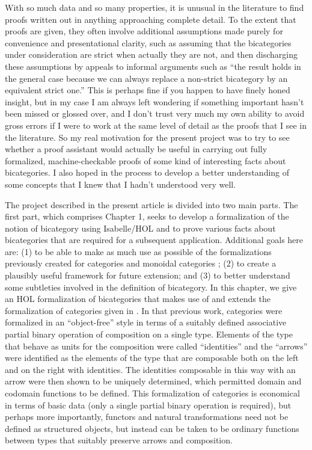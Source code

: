 \documentclass[11pt,notitlepage,a4paper]{report}
\begin{document}
With so much data and so many properties, it is unusual in the literature to find proofs written
out in anything approaching complete detail.
To the extent that proofs are given, they often involve additional assumptions made purely for
convenience and presentational clarity, such as assuming that the bicategories under consideration
are strict when actually they are not, and then discharging these assumptions by appeals to informal
arguments such as ``the result holds in the general case because we can always replace a non-strict
bicategory by an equivalent strict one.''
This is perhaps fine if you happen to have finely honed insight, but in my case I am always left
wondering if something important hasn't been missed or glossed over, and I don't trust very much
my own ability to avoid gross errors if I were to work at the same level of detail as the proofs
that I see in the literature.
So my real motivation for the present project was to try to see whether a proof assistant
would actually be useful in carrying out fully formalized, machine-checkable proofs of some kind
of interesting facts about bicategories.  I also hoped in the process to develop a better
understanding of some concepts that I knew that I hadn't understood very well.

The project described in the present article is divided into two main parts.
The first part, which comprises Chapter 1, seeks to develop a formalization of the notion of
bicategory using Isabelle/HOL and to prove various facts about bicategories that are required
for a subsequent application.  Additional goals here are:
(1) to be able to make as much use as possible of the formalizations previously created for
categories \cite{Category3-AFP} and monoidal categories \cite{MonoidalCategory-AFP};
(2) to create a plausibly useful framework for future extension; and
(3) to better understand some subtleties involved in the definition of bicategory.
In this chapter, we give an HOL formalization of bicategories that makes use of and extends the
formalization of categories given in \cite{Category3-AFP}.  In that previous work, categories
were formalized in an ``object-free'' style in terms of a suitably defined associative partial
binary operation of composition on a single type.  Elements of the type that behave as units
for the composition were called ``identities'' and the ``arrows'' were identified as
the elements of the type that are composable both on the left and on the right with identities.
The identities composable in this way with an arrow were then shown to be uniquely determined,
which permitted domain and codomain functions to be defined.
This formalization of categories is economical in terms of basic data (only a single partial
binary operation is required), but perhaps more importantly, functors and natural transformations
need not be defined as structured objects, but instead can be taken to be ordinary functions
between types that suitably preserve arrows and composition.
\end{document}
